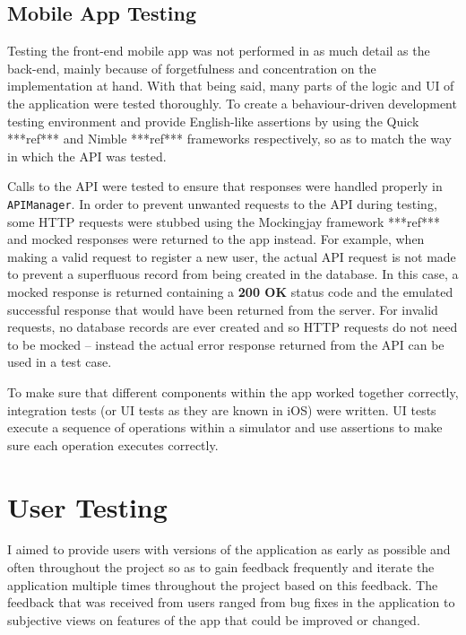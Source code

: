 \subsection{Mobile App Testing}

Testing the front-end mobile app was not performed in as much detail as the back-end, mainly because of forgetfulness and concentration on the implementation at hand. With that being said, many parts of the logic and UI of the application were tested thoroughly. To create a behaviour-driven development testing environment and provide English-like assertions by using the Quick ***ref*** and Nimble ***ref*** frameworks respectively, so as to match the way in which the API was tested.

Calls to the API were tested to ensure that responses were handled properly in \verb|APIManager|. In order to prevent unwanted requests to the API during testing, some HTTP requests were stubbed using the Mockingjay framework ***ref*** and mocked responses were returned to the app instead. For example, when making a valid request to register a new user, the actual API request is not made to prevent a superfluous record from being created in the database. In this case, a mocked response is returned containing a \textbf{200 OK} status code and the emulated successful response that would have been returned from the server. For invalid requests, no database records are ever created and so HTTP requests do not need to be mocked -- instead the actual error response returned from the API can be used in a test case.

To make sure that different components within the app worked together correctly, integration tests (or UI tests as they are known in iOS) were written. UI tests execute a sequence of operations within a simulator and use assertions to make sure each operation executes correctly.


\section{User Testing}

I aimed to provide users with versions of the application as early as possible and often throughout the project so as to gain feedback frequently and iterate the application multiple times throughout the project based on this feedback. The feedback that was received from users ranged from bug fixes in the application to subjective views on features of the app that could be improved or changed.

